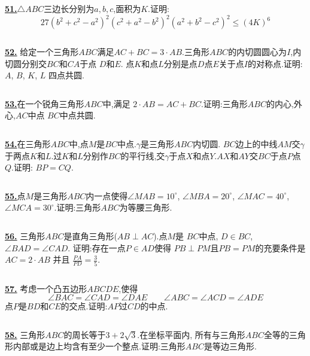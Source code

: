 \documentclass{article}
\begin{document}
$$ $$

\href{ http://www.artofproblemsolving.com/Forum/viewtopic.php?p=480525#p480525
}{\bf 51.}$\triangle ABC$三边长分别为$a, b, c$,面积为$K$.证明:
$$ 27 (b^2 + c^2 - a^2)^2 (c^2 + a^2 - b^2)^2 (a^2 + b^2 - c^2)^2 \le (4K)^6$$



$$ $$

\href{ http://www.artofproblemsolving.com/Forum/viewtopic.php?p=439274#p439274
}{\bf 52.} 给定一个三角形$ABC$满足$AC+BC=3\cdot AB$.三角形$ABC$的内切圆圆心为$I$,内切圆分别交$BC$和$CA$于点 $D$和$E$. 点$K$和点$L$分别是点$D$点$E$关于点$I$的对称点.证明: $A$, $B$, $K$, $L$ 四点共圆.


$$ $$


\href{http://www.artofproblemsolving.com/Forum/viewtopic.php?p=476117#p476117
 }{\bf 53.}在一个锐角三角形$ABC$中,满足 $2\cdot AB = AC + BC$.证明:三角形$ABC$的内心,外心,$AC$中点 $BC$中点共圆.

$$ $$


\href{http://www.artofproblemsolving.com/Forum/viewtopic.php?p=463068#p463068
 }{\bf 54.}在三角形$ABC$中,点$M$是$BC$中点.$\gamma$是三角形$ABC$内切圆. $BC$边上的中线$AM$交$\gamma$于两点$K$和$L$.过$K$和$L$分别作$BC$的平行线,交$\gamma$于点$X$和点$Y$.$AX$和$AY$交$BC$于点$P$点$Q$.证明: $BP = CQ$.


$$ $$

\href{ http://www.artofproblemsolving.com/Forum/viewtopic.php?p=2#p2
}{\bf 55.}点$M$是三角形$ABC$内一点使得$\angle MAB=10^\circ$, $\angle MBA=20^\circ$, $\angle MAC=40^\circ$,$\angle MCA=30^\circ$.证明:三角形$ABC$为等腰三角形.


$$ $$

\href{http://www.artofproblemsolving.com/Forum/viewtopic.php?p=448458#p448458
 }{\bf 56.} 三角形$ABC$是直角三角形($AB\perp AC$).点$M$是 $BC$中点, $D\in BC$, $\angle BAD=\angle CAD$. 证明:存在一点$P\in AD$使得 $PB\perp PM$且$PB=PM$的充要条件是$AC=2\cdot AB$ 并且 $\displaystyle\frac{PA}{PD}=\frac 35$.


$$ $$

\href{ http://www.artofproblemsolving.com/Forum/viewtopic.php?p=741369#p741369
}{\bf 57.} 考虑一个凸五边形$ABCDE$,使得
$$ \angle BAC = \angle CAD = \angle DAE \quad \quad  \angle ABC = \angle ACD = \angle ADE
$$
点$ P$是$ BD$和$ CE$的交点.证明:$ AP$过$ CD$的中点.

$$ $$

\href{ http://www.artofproblemsolving.com/Forum/viewtopic.php?p=2111860#p2111860
}{\bf 58.} 三角形$ABC$的周长等于$3+2\sqrt3$.在坐标平面内, 所有与三角形$ABC$全等的三角形内部或是边上均含有至少一个整点.证明:三角形$ABC$是等边三角形.
\end{document}
